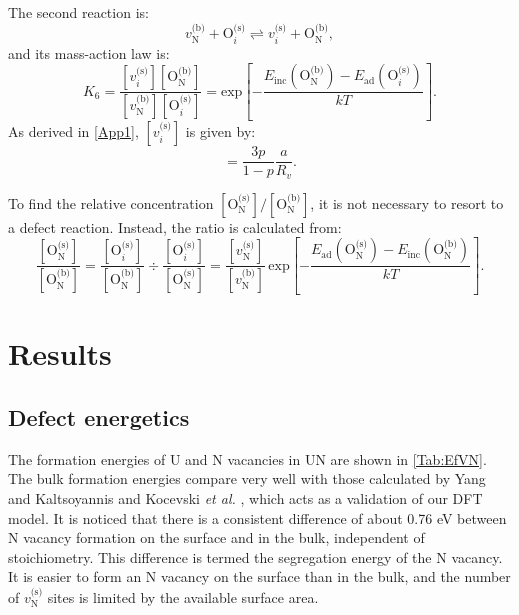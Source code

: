 \documentclass[preprint,12pt,sort&compress]{elsarticle}
\newcommand{\?}{\stackrel{?}{=}}
\begin{document}
The second reaction is:
\begin{equation}
v_\text{N}^\text{(b)} + \text{O}_i^\text{(s)}  \rightleftharpoons v_i^\text{(s)} + \text{O}_\text{N}^\text{(b)},
\end{equation}
and its mass-action law is:
\begin{equation}
K_6 = \frac{ [ v_i^\text{(s)} ]  [ \text{O}_\text{N}^\text{(b)} ] }{ [ v_\text{N}^\text{(b)} ] [ \text{O}_i^\text{(s)} ] } = \text{exp}\! \left[ - \frac{ E_\text{inc}( \text{O}_\text{N}^\text{(b)} ) - E_\text{ad}( \text{O}_i^\text{(s)} ) }{ k T } \right].
\end{equation}
As derived in \ref{App1}, $[ v_i^\text{(s)} ]$ is given by:
\begin{equation}
[ v_i^\text{(s)} ] = \frac{3p}{1-p} \frac{a}{R_v}.
\label{Eq:v_i^s}
\end{equation}

To find the relative concentration $[ \text{O}_\text{N}^\text{(s)} ] / [ \text{O}_\text{N}^\text{(b)} ]$, it is not necessary to resort to a defect reaction. Instead, the ratio is calculated from: 
\begin{equation}
\frac{ [ \text{O}_\text{N}^\text{(s)} ] }{ [ \text{O}_\text{N}^\text{(b)} ] } = \frac{ [ \text{O}_i^\text{(s)} ] }{ [ \text{O}_\text{N}^\text{(b)} ] } \div \frac{ [ \text{O}_i^\text{(s)} ] }{ [ \text{O}_\text{N}^\text{(s)} ] } = \frac{ [v_\text{N}^\text{(s)}] }{ [v_\text{N}^\text{(b)}] } \, \text{exp}\! \left[ - \frac{ E_\text{ad}( \text{O}_\text{N}^\text{(s)} ) - E_\text{inc}( \text{O}_\text{N}^\text{(b)} ) }{ k T } \right].
\label{Eq:ONs_ONb}
\end{equation}

\section{Results}
\label{Sec:Results}

\subsection{Defect energetics}
\label{Sec:DefE}

The formation energies of U and N vacancies in UN are shown in \cref{Tab:EfVN}. The bulk formation energies compare very well with those calculated by Yang and Kaltsoyannis \cite{Yang2021} and Kocevski \textit{et al.} \cite{Kocevski2022I}, which acts as a validation of our DFT model. It is noticed that there is a consistent difference of about 0.76 eV between N vacancy formation on the surface and in the bulk, independent of stoichiometry. This difference is termed the segregation energy of the N vacancy. It is easier to form an N vacancy on the surface than in the bulk, and the number of $v_\text{N}^\text{(s)}$ sites is limited by the available surface area.
\end{document}
